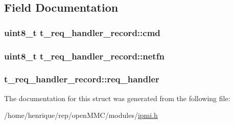 \subsection{Field Documentation}
\hypertarget{structt__req__handler__record_a373d4df79039c000eaa3d1f4cb69dbee}{
\subsubsection[{cmd}]{\setlength{\rightskip}{0pt plus 5cm}uint8\-\_\-t t\-\_\-req\-\_\-handler\-\_\-record\-::cmd}}\label{structt__req__handler__record_a373d4df79039c000eaa3d1f4cb69dbee}
\hypertarget{structt__req__handler__record_a463c0d13acdc0decbf680df8a5acbc61}{
\subsubsection[{netfn}]{\setlength{\rightskip}{0pt plus 5cm}uint8\-\_\-t t\-\_\-req\-\_\-handler\-\_\-record\-::netfn}}\label{structt__req__handler__record_a463c0d13acdc0decbf680df8a5acbc61}
\hypertarget{structt__req__handler__record_ab826c04d89a5dda30151ce0bacb13839}{
\subsubsection[{req\-\_\-handler}]{ t\-\_\-req\-\_\-handler\-\_\-record\-::req\-\_\-handler}}\label{structt__req__handler__record_ab826c04d89a5dda30151ce0bacb13839}


The documentation for this struct was generated from the following file\-:\begin{DoxyCompactItemize}
\item 
/home/henrique/rep/open\-M\-M\-C/modules/\hyperlink{ipmi_8h}{ipmi.\-h}\end{DoxyCompactItemize}
